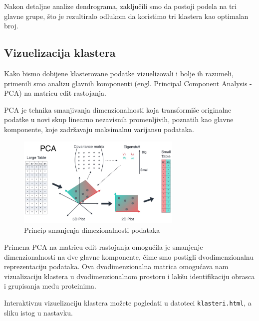\documentclass[a4paper,12pt]{article}
\begin{document}
\bigskip
Nakon detaljne analize dendrograma, zaključili smo da postoji podela na tri glavne grupe, što je rezultiralo odlukom da koristimo tri klastera kao optimalan broj.


\subsection{Vizuelizacija klastera}
Kako bismo dobijene klasterovane podatke vizuelizovali i bolje ih razumeli, primenili smo analizu glavnih komponenti (engl. Principal Component Analysis - PCA) na matricu edit rastojanja. 

\medskip
PCA je tehnika smanjivanja dimenzionalnosti koja transformiše originalne podatke u novi skup linearno nezavisnih promenljivih, poznatih kao glavne komponente, koje zadržavaju maksimalnu varijansu podataka.

\bigskip
\begin{figure}[h!]
  \centering
  \includegraphics[width=0.7\textwidth]{slika22.jpeg}
  \caption{Princip smanjenja dimezionalnosti podataka}
  \label{fig:my_label}
\end{figure}

\bigskip
Primena PCA na matricu edit rastojanja omogućila je smanjenje dimenzionalnosti na dve glavne komponente, čime smo postigli dvodimenzionalnu reprezentaciju podataka. Ova dvodimenzionalna matrica omogućava nam vizualizaciju klastera u dvodimenzionalnom prostoru i lakšu identifikaciju obrasca i grupisanja među proteinima.

\bigskip
Interaktivnu vizuelizaciju klastera možete pogledati u datoteci \texttt{klasteri.html}, a sliku istog u nastavku.
\end{document}
